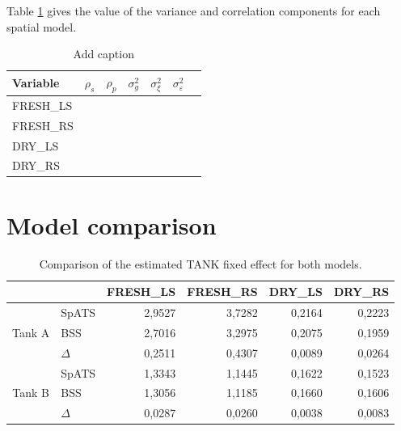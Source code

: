 %

Table \ref{tab:BSS_variance_values} gives the value of the variance and correlation components for each spatial model.

\begin{table}[htbp]
  \centering
  \caption{Add caption}
    \begin{tabular}{lrrrrrr}
    \toprule
    Variable & \multicolumn{1}{l}{$\rho_{s}$} & \multicolumn{1}{l}{$\rho_{p}$} & \multicolumn{1}{l}{$\sigma_{g}^{2}$} & \multicolumn{1}{l}{$\sigma_{\xi}^{2}$} & \multicolumn{1}{l}{$\sigma_{\varepsilon}^{2}$} &  \\
    \midrule
    FRESH\_LS &       &       &       &       &       &  \\
    FRESH\_RS &       &       &       &       &       &  \\
    DRY\_LS &       &       &       &       &       &  \\
    DRY\_RS &       &       &       &       &       &  \\
    \bottomrule
    \end{tabular}%
  \label{tab:BSS_variance_values}%
\end{table}%



\section{Model comparison}

\begin{table}[htbp]
  \centering
  \caption{Comparison of the estimated TANK fixed effect for both models.}
    \begin{tabular}{clrrrr}
    \toprule
          &       & \multicolumn{1}{l}{FRESH\_LS} & \multicolumn{1}{l}{FRESH\_RS} & \multicolumn{1}{l}{DRY\_LS} & \multicolumn{1}{l}{DRY\_RS} \\
    \midrule
    \multirow{3}[1]{*}{Tank A} & SpATS & 2,9527 & 3,7282 & 0,2164 & 0,2223 \\
          & BSS   & 2,7016 & 3,2975 & 0,2075 & 0,1959 \\
          & $\Delta$ & 0,2511 & 0,4307 & 0,0089 & 0,0264 \\
    \multirow{3}[1]{*}{Tank B} & SpATS & 1,3343 & 1,1445 & 0,1622 & 0,1523 \\
          & BSS   & 1,3056 & 1,1185 & 0,1660 & 0,1606 \\
          & $\Delta$ & 0,0287 & 0,0260 & 0,0038 & 0,0083 \\
    \bottomrule
    \end{tabular}%

  \label{tab:tank_effect_model_comparison}%
\end{table}%


